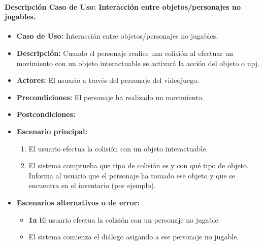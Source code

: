 \documentclass[a4paper,10pt]{article}
\begin{document}
\paragraph*{Descripción Caso de Uso: Interacción entre objetos/personajes no jugables.}
\begin{itemize}
\item \textbf{Caso de Uso:} Interacción entre objetos/personajes no jugables.
\item \textbf{Descripción:} Cuando el personaje realice una colisión al
  efectuar un movimiento con un objeto interactuable se activará la acción del
  objeto o npj.
\item \textbf{Actores:} El usuario a través del personaje del videojuego.
\item \textbf{Precondiciones:} El personaje ha realizado un movimiento.
\item \textbf{Postcondiciones:}
\item \textbf{Escenario principal:} \\
\begin{enumerate}
\item El usuario efectua la colisión con un objeto interactuable.
\item El sistema comprueba que tipo de colisión es y con qué tipo de
  objeto. Informa al usuario que el personaje ha tomado ese objeto y que se
  encuentra en el inventario (por ejemplo).
\end{enumerate}
\item \textbf{Escenarios alternativos o de error:} \\
\begin{itemize}
\item \textbf{1a} El usuario efectua la colisión con un personaje no jugable.
\item \textbf{  } El sistema comienza el diálogo asigando a ese personaje no jugable.
\end{itemize}
\end{itemize}
\end{document}
